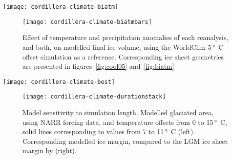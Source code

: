 \begin{figure*}[t]
	\vspace*{2mm}
	\begin{center}
		\texttt{[image: cordillera-climate-biatm]}
	\end{center}
	\caption{“Hybrid” atmosphere simulations using precipitation rate from WorldClim and surface air temperature from each reanalysis (upper row), and vice-versa (lower row).  (1 km contours)In other words, the upper row shows the effect of temperature anomalies, and the lower row the effect of precipitation anomalies, for each reanalysis, relative to WorldClim data. Each simulation use a 5\,\unit{\degree C} offset. Compare with figure~\ref{fig:cool05}}
	\label{fig:biatm}
\end{figure*}

\begin{figure}[t]
	\vspace*{2mm}
	\begin{center}
		\texttt{[image: cordillera-climate-biatmbars]}
	\end{center}
	\caption{Effect of temperature and precipitation anomalies of each reanalysis, and both, on modelled final ice volume, using the WorldClim 5\,\unit{\degree C} offset simulation as a reference. Corresponding ice sheet geometries are presented in figures~\ref{fig:cool05} and~\ref{fig:biatm}}
	\label{fig:biatmbars}
\end{figure}

\begin{figure*}[t]
	\vspace*{2mm}
	\begin{center}
		\texttt{[image: cordillera-climate-best]}
	\end{center}
	\caption{Ice surface topography (1\,km contours) after 10\,kyr using temperature offsets resulting in glaciated areas of circa $2\,\times10^6\,\unit{km^2}$. A reconstructed LGM ice sheet margin by \citet{dyke-2004} (Fig.~\ref{fig:locmap}) is given for reference (blue line).}
	\label{fig:best}
\end{figure*}

\begin{figure}[t]
	\vspace*{2mm}
	\begin{center}
		\texttt{[image: cordillera-climate-durationstack]}
	\end{center}
	\caption{Model sensitivity to simulation length. Modelled glaciated area, using NARR forcing data, and temperature offsets from 0 to 15\,\unit{\degree C}, solid lines corresponding to values from 7 to 11\,\unit{\degree C} (left). Corresponding modelled ice margin, compared to the LGM ice sheet margin by \citep{dyke-2004} (right).}
	\label{fig:durationstack}
\end{figure}
